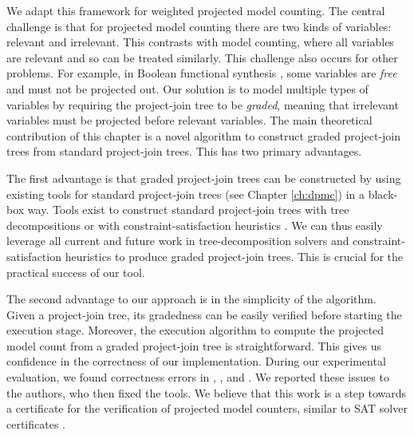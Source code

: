 We adapt this framework for weighted projected model counting. The central challenge is that for projected model counting there are two kinds of variables: relevant and irrelevant. This contrasts with model counting, where all variables are relevant and so can be treated similarly. This challenge also occurs for other problems.
For example, in Boolean functional synthesis \cite{tabajara2017factored}, some variables are \emph{free} and must not be projected out. 
Our solution is to model multiple types of variables by requiring the project-join tree to be \emph{graded}, meaning that irrelevant variables must be projected before relevant variables. The main theoretical contribution of this chapter is a novel algorithm to construct graded project-join trees from standard project-join trees. This has two primary advantages. 

The first advantage is that graded project-join trees can be constructed by using existing tools for standard project-join trees (see Chapter \ref{ch:dpmc}) in a black-box way. Tools exist to construct standard project-join trees with tree decompositions \cite{RS91} or with constraint-satisfaction heuristics \cite{tarjan1984simple,koster2001treewidth,dechter03,dechter99,bouquet1999gestion}.
We can thus easily leverage all current and future work in tree-decomposition solvers \cite{strasser2017computing,AMW17,Tamaki17} and constraint-satisfaction heuristics to produce graded project-join trees. This is crucial for the practical success of our tool.

The second advantage to our approach is in the simplicity of the algorithm. Given a project-join tree, its gradedness can be easily verified before starting the execution stage. 
Moreover, the execution algorithm to compute the projected model count from a graded project-join tree is straightforward. This gives us confidence in the correctness of our implementation.
During our experimental evaluation, we found correctness errors in \dfp{} \cite{lagniez2019recursive}, \projmc{} \cite{lagniez2019recursive}, and \ssat{} \cite{lee2017solving}.
We reported these issues to the authors, who then fixed the tools.
We believe that this work is a step towards a certificate for the verification of projected model counters, similar to SAT solver certificates \cite{wetzler2014drat}.

